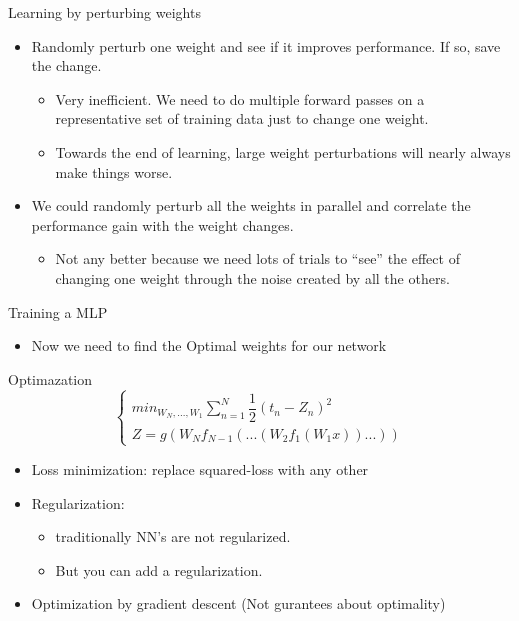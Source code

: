 \begin{frame}{Learning by perturbing weights}
    \begin{itemize}
        \item Randomly perturb one weight and see
if it improves performance. If so, save
the change.
        \begin{itemize}
            \item Very inefficient. We need to do
multiple forward passes on a
representative set of training data
just to change one weight.
            \item Towards the end of learning, large
weight perturbations will nearly
always make things worse.
        \end{itemize}
        \item We could randomly perturb all the
weights in parallel and correlate the
performance gain with the weight
changes.
        \begin{itemize}
            \item Not any better because we need
lots of trials to “see” the effect of
changing one weight through the
noise created by all the others.
        \end{itemize}
    \end{itemize}
\end{frame}

\begin{frame}{Training a MLP}
    \begin{itemize}
        \item Now we need to find the Optimal weights for our network
    \end{itemize}
    \begin{block}{Optimazation}
        \[
            \begin{cases}
                min_{W_N, ..., W_1} \sum_{n=1}^{N} \dfrac{1}{2} (t_n - Z_n)^2 \\
                Z = g(W_Nf_{N-1}(...(W_2f_1(W_1x))...))
            \end{cases}
        \]
    \end{block}
    \begin{itemize}
        \item Loss minimization: replace squared-loss with any other
        \item Regularization:
        \begin{itemize}
            \item traditionally NN's are not regularized.
            \item But you can add a regularization.
        \end{itemize}
        \item Optimization by gradient descent (Not gurantees about optimality)
    \end{itemize}
\end{frame}

